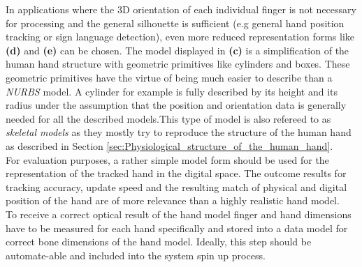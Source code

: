 In applications where the 3D orientation of each individual finger is not necessary for processing and the general silhouette is sufficient (e.g general hand position tracking or sign language detection), even more reduced representation forms like \textbf{(d)} and \textbf{(e)} can be chosen.
The model displayed in \textbf{(c)} is a simplification of the human hand structure with geometric primitives like cylinders and boxes. These geometric primitives have the virtue of being much easier to describe than a \textit{NURBS} model. A cylinder for example is fully described by its height and its radius under the assumption that the position and orientation data is generally needed for all the described models.This type of model is also refereed to as \textit{skeletal models} as they mostly try to reproduce the structure of the human hand as described in Section \ref{sec:Physiological_structure_of_the_human_hand}.\\
For evaluation purposes, a rather simple model form should be used for the representation of the tracked hand in the digital space. The outcome results for tracking accuracy, update speed and the resulting match of physical and digital position of the hand are of more relevance than a highly realistic hand model.
\\To receive a correct optical result of the hand model finger and hand dimensions have to be measured for each hand specifically and stored into a data model for correct bone dimensions of the hand model. Ideally, this step should be automate-able and included into the system spin up process.
 